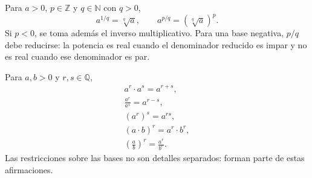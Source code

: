 \begin{tcolorbox}[resumen,title=Exponentes racionales]
Para \(a>0\), \(p\in\mathbb Z\) y \(q\in\mathbb N\) con \(q>0\),
\[
a^{1/q}=\sqrt[q]{a},
\qquad
a^{p/q}=\left(\sqrt[q]{a}\right)^p.
\]
Si \(p<0\), se toma además el inverso multiplicativo. Para una base negativa, \(p/q\) debe reducirse: la potencia es real cuando el denominador reducido es impar y no es real cuando ese denominador es par.
\end{tcolorbox}

\begin{tcolorbox}[resumen,title=Condiciones de las propiedades]
Para \(a,b>0\) y \(r,s\in\mathbb Q\),
\begin{gather*}
a^r\cdot a^s=a^{r+s},\\
\frac{a^r}{a^s}=a^{r-s},\\
(a^r)^s=a^{rs},\\
(a\cdot b)^r=a^r\cdot b^r,\\
\left(\frac ab\right)^r=\frac{a^r}{b^r}.
\end{gather*}
Las restricciones sobre las bases no son detalles separados: forman parte de estas afirmaciones.
\end{tcolorbox}
